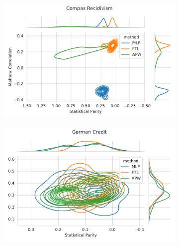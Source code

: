 \begin{figure}
\begin{subfigure}{.45\linewidth}
    \includegraphics[width=1\linewidth]{images/pareto_mcc_parity_compas.pdf}
\end{subfigure}
\begin{subfigure}{.45\linewidth}
    \includegraphics[width=1\linewidth]{images/pareto_mcc_parity_german.pdf}
\end{subfigure}
\end{figure}
    
